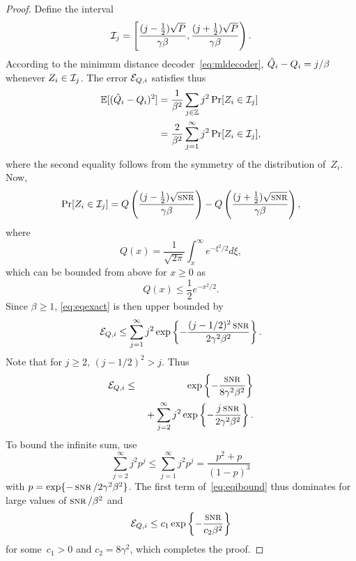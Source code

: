 \begin{proof}
  Define the interval
  \begin{equation*}
    \mathcal{I}_j = \left[ \frac{(j - \frac12) \sqrt{P}}{\gamma\beta},
    \frac{(j + \frac12) \sqrt{P}}{\gamma\beta } \right).
  \end{equation*}
  According to the minimum distance decoder~\eqref{eq:mldecoder}, $\hat{Q}_i - Q_i
  = j/\beta$ whenever $Z_i \in \mathcal{I}_j$.  The error ${{\mathcal{E}}_{Q,i}}$ satisfies thus
  \begin{align}
    \mathbb{E}[(\hat{Q}_i - Q_i)^2] &= \frac{1}{\beta^2} \sum_{j \in \mathbb{Z}} j^2 \Pr[Z_i \in
    \mathcal{I}_j]  \nonumber \\
    &= \frac{2}{\beta^2} \sum_{j = 1}^\infty j^2 \Pr[Z_i \in \mathcal{I}_j],
    \label{eq:eqexact}
  \end{align}
  where the second equality follows from the symmetry of the distribution
  of~$Z_i$. Now,
  \begin{equation*}
    \Pr[Z_i \in \I_j] = Q\left( \frac{(j - \frac12) \sqrt{\snr}}{\gamma\beta}
    \right) - Q\left( \frac{(j + \frac12) \sqrt{\snr}}{\gamma\beta } \right),
  \end{equation*}
  where
  \begin{equation*}
    Q(x) = \frac{1}{\sqrt{2\pi}} \int_x^\infty e^{-\xi^2/2} d\xi,
  \end{equation*}
  which can be bounded from above for $x \ge 0$ as
  \begin{equation*}
    Q(x) \le \frac12 e^{-x^2/2}.
  \end{equation*}
  Since $\beta \ge 1$, \eqref{eq:eqexact} is then upper bounded by
  \begin{equation*}
    \Eqi \le \sum_{j=1}^\infty j^2 \exp\left\{ - \frac{(j - 1/2)^2
    \snr}{2\gamma^2\beta^2} \right\}.
  \end{equation*}
  Note that for $j \ge 2$, $(j - 1/2)^2 > j$.  Thus
  \begin{eqnarray}
    \Eqi &\le & \exp \left \{ - \frac{\snr}{8 \gamma^2 \beta^2} \right\}
    \nonumber \\
    & & \mbox{} + 
    \sum_{j = 2}^\infty j^2 \exp \left \{ - \frac{j \snr}{2\gamma^2 \beta^2}
    \right\}. \label{eq:eqibound}
  \end{eqnarray}
  To bound the infinite sum, use 
  \begin{equation}
    \label{eq:geomsum}
    \sum_{j=2}^\infty j^2 p^j \le \sum_{j=1}^\infty j^2 p^j = 
    \frac{p^2+p}{(1-p)^3}
  \end{equation}
  with $p = \exp\{-\snr/2 \gamma^2 \beta^2\}$. The first term
  of~\eqref{eq:eqibound} thus dominates for large values of
  $\snr/\beta^2$ and
  \begin{equation*}
    \Eqi \le c_1\exp\left\{ - \frac{\snr}{c_2 \beta^2} \right\}
  \end{equation*}
  for some~$c_1 > 0$ and $c_2 = 8 \gamma^2$, which completes the proof. 
\end{proof}

